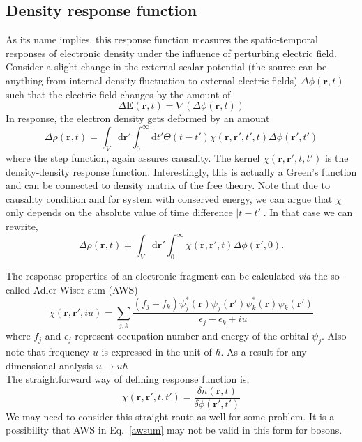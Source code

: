 \documentclass{article}
\newcommand{\eq}{\begin{equation}}
\newcommand{\qe}{\end{equation}}
\newcommand{\diff}{\mathrm{d}}
\newcommand{\rr}{\mathbf{r}}
\newcommand{\abs}[1]{\vert #1\vert}
\newcommand{\via}{\emph{via }}
\begin{document}
\subsection{Density response function}
As its name implies, this response function measures the spatio-temporal responses of electronic density under the influence of perturbing electric field. Consider a slight change in the external scalar potential (the source can be anything from internal density fluctuation to external electric fields) $\Delta \phi(\mathbf{r}, t)$ such that the electric field changes by the amount of 
\eq
 \Delta \mathbf{E}(\mathbf{r}, t) = \nabla(\Delta \phi(\mathbf{r}, t))
\qe
In response, the electron density gets deformed by an amount
\eq
\Delta \rho(\mathbf{r}, t) = \int_{V} \diff \mathbf{r}' \int_{0}^{\infty} \diff t' \Theta(t - t') \chi(\mathbf{r},\mathbf{r}', t', t) \Delta \phi(\mathbf{r}', t') 
\qe
where the step function, again assures causality. The kernel $\chi(\rr, \rr', t, t')$ is the density-density response function. Interestingly, this is actually a Green's function and can be connected to density matrix of the free theory.  Note that due to causality condition and for system with conserved energy, we can argue that $\chi$ only depends on the absolute value of time difference $\abs{t-t'}$. In that case we can rewrite,
\eq
\Delta \rho(\mathbf{r}, t) = \int_{V} \diff \mathbf{r}' \int_{0}^{\infty} \chi(\mathbf{r},\mathbf{r}', t) \Delta \phi(\mathbf{r}', 0).
\qe

\par The response properties of an electronic fragment can be calculated \via the so-called Adler-Wiser sum (AWS)
\eq\label{awsum}
\chi(\rr, \rr', i u) = \sum_{j,k}\frac{(f_{j}-f_{k})\psi_{j}^{*}(\rr)\psi_{j}(\rr')\psi_{k}^{*}(\rr)\psi_{k}(\rr')}{\epsilon_{j}-\epsilon_{k}+ i u}
\qe
where $f_{j}$ and $\epsilon_{j}$ represent occupation number and energy of the orbital $\psi_{j}$. Also note that frequency $u$ is expressed in the unit of $\hbar$. As a result for any dimensional analysis $u \rightarrow u \hbar$\\

The straightforward way of defining response function is,
\eq
 \chi(\rr,\rr',t,t') = \frac{\delta n(\rr,t)}{\delta \phi(\rr',t')}
\qe 
We may need to consider this straight route as well for some problem. It is a possibility that  AWS in Eq.~\eqref{awsum} may not be valid in this form for bosons. 
\end{document}
